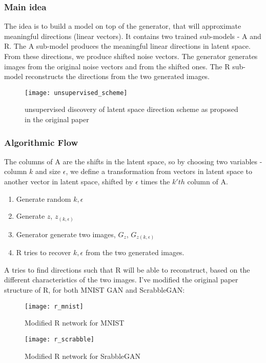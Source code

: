 \subsubsection{Main idea}

The idea is to build a model on top of the generator, that will approximate meaningful directions (linear vectors). It contains two trained sub-models - A and R.
The A sub-model produces the meaningful linear directions in latent space. From these directions, we produce shifted noise vectors.  The generator generates images from the original noise vectors and from the shifted ones. The R sub-model reconstructs the directions from the two generated images.


\begin{figure}[h]
\centering
\texttt{[image: unsupervised\_scheme]}
\caption{unsupervised discovery of latent space direction scheme as proposed in the original paper}
\label{fig:x cubed graph}
\end{figure}

\subsubsection{Algorithmic Flow}

The columns of A are the shifts in the latent space, so by choosing two variables - column $k$ and size $\epsilon$, we define a transformation from vectors in latent space to another vector in latent space, shifted by $\epsilon$ times the $k'th$ column of A.

\begin{enumerate}
\item Generate random $k, \epsilon$
\item Generate $z$, $z_{(k, \epsilon)}$	
\item Generator generate two images, $G_{z}$, $G_{z(k, \epsilon)}$ 

\item	R tries to recover $k, \epsilon $ from the 		two generated images. 
	
\end{enumerate}

A tries to find directions such that R will be able to reconstruct, based on the different characteristics of the two images. I've modified the original paper structure of R, for both MNIST GAN and ScrabbleGAN: 


\begin{figure}[!tbp]
  \centering
  \begin{minipage}[b]{0.4\textwidth}
    \texttt{[image: r\_mnist]}
    \caption{Modified R network for MNIST}
  \end{minipage}
  \hfill
  \begin{minipage}[b]{0.4\textwidth}
    \texttt{[image: r\_scrabble]}
    \caption{Modified R network for SrabbleGAN}
  \end{minipage}
\end{figure}



